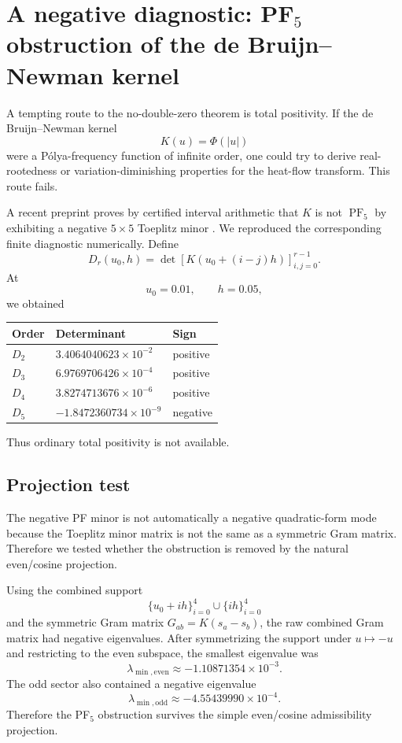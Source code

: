 \documentclass[11pt]{article}
\DeclareMathOperator{\PF}{PF}
\begin{document}
\section{A negative diagnostic: PF\texorpdfstring{$_5$}{5} obstruction of the de Bruijn--Newman kernel}

A tempting route to the no-double-zero theorem is total positivity. If the de Bruijn--Newman kernel
\[
        K(u)=\Phi(|u|)
\]
were a P\'olya-frequency function of infinite order, one could try to derive real-rootedness or variation-diminishing properties for the heat-flow transform. This route fails.

A recent preprint proves by certified interval arithmetic that $K$ is not $\PF_5$ by exhibiting a negative $5\times5$ Toeplitz minor \cite{Michalowski2026}. We reproduced the corresponding finite diagnostic numerically. Define
\[
\boxed{
        D_r(u_0,h)=\det\left[K(u_0+(i-j)h)\right]_{i,j=0}^{r-1}.
}
\]
At
\[
        u_0=0.01,
        \qquad h=0.05,
\]
we obtained
\begin{center}
\begin{tabular}{@{}lll@{}}
\toprule
Order & Determinant & Sign\\
\midrule
$D_2$ & $3.4064040623\times10^{-2}$ & positive\\
$D_3$ & $6.9769706426\times10^{-4}$ & positive\\
$D_4$ & $3.8274713676\times10^{-6}$ & positive\\
$D_5$ & $-1.8472360734\times10^{-9}$ & negative\\
\bottomrule
\end{tabular}
\end{center}
Thus ordinary total positivity is not available.

\subsection{Projection test}

The negative PF minor is not automatically a negative quadratic-form mode because the Toeplitz minor matrix is not the same as a symmetric Gram matrix. Therefore we tested whether the obstruction is removed by the natural even/cosine projection.

Using the combined support
\[
        \{u_0+ih\}_{i=0}^4\cup\{ih\}_{i=0}^4
\]
and the symmetric Gram matrix $G_{ab}=K(s_a-s_b)$, the raw combined Gram matrix had negative eigenvalues. After symmetrizing the support under $u\mapsto -u$ and restricting to the even subspace, the smallest eigenvalue was
\[
\boxed{
        \lambda_{\min,\mathrm{even}}\approx -1.10871354\times10^{-3}.
}
\]
The odd sector also contained a negative eigenvalue
\[
\boxed{
        \lambda_{\min,\mathrm{odd}}\approx -4.55439990\times10^{-4}.
}
\]
Therefore the PF$_5$ obstruction survives the simple even/cosine admissibility projection.
\end{document}
